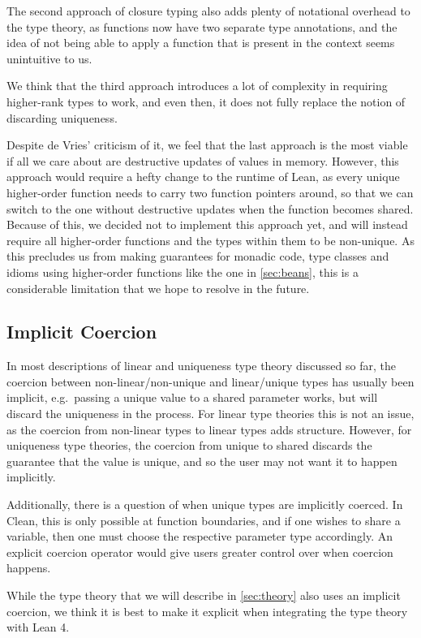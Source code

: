 The second approach of closure typing also adds plenty of notational overhead to the type theory, as functions now have two separate type annotations, and the idea of not being able to apply a function that is present in the context seems unintuitive to us.

We think that the third approach introduces a lot of complexity in requiring higher-rank types to work, and even then, it does not fully replace the notion of discarding uniqueness.

Despite de Vries' criticism of it, we feel that the last approach is the most viable if all we care about are destructive updates of values in memory. However, this approach would require a hefty change to the runtime of Lean, as every unique higher-order function needs to carry two function pointers around, so that we can switch to the one without destructive updates when the function becomes shared. Because of this, we decided not to implement this approach yet, and will instead require all higher-order functions and the types within them to be non-unique. As this precludes us from making guarantees for monadic code, type classes and idioms using higher-order functions like the one in \cref{sec:beans}, this is a considerable limitation that we hope to resolve in the future.

\subsection{Implicit Coercion}\label{sec:coercions}
In most descriptions of linear and uniqueness type theory discussed so far, the coercion between non-linear/non-unique and linear/unique types has usually been implicit, e.g.\ passing a unique value to a shared parameter works, but will discard the uniqueness in the process. For linear type theories this is not an issue, as the coercion from non-linear types to linear types adds structure. However, for uniqueness type theories, the coercion from unique to shared discards the guarantee that the value is unique, and so the user may not want it to happen implicitly. 

Additionally, there is a question of when unique types are implicitly coerced. In Clean, this is only possible at function boundaries, and if one wishes to share a variable, then one must choose the respective parameter type accordingly. An explicit coercion operator would give users greater control over when coercion happens.

While the type theory that we will describe in \cref{sec:theory} also uses an implicit coercion, we think it is best to make it explicit when integrating the type theory with Lean 4.

